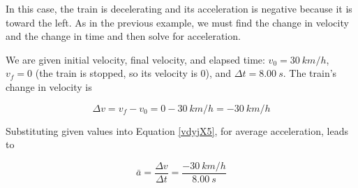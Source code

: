 \documentclass[main-ap-physics.tex]{subfiles}
\begin{document}
\begin{center}
\end{center}

\Solution In this case, the train is decelerating and its acceleration is negative because it is toward the left. As in the previous example, we must find the change in velocity and the change in time and then solve for acceleration.

\vspace{1em}

We are given initial velocity, final velocity, and elapsed time: $v_0 = \SI{30}{km/h}$, $v_f = 0$ (the train is stopped, so its velocity is 0), and $\Delta t = \SI{8.00}{s}$. The train's change in velocity is

\begin{equation*}
    \Delta v = v_f - v_0 = 0 - \SI{30}{km/h} = -\SI{30}{km/h}
\end{equation*}

Substituting given values into Equation \ref{vdyjX5}, for average acceleration, leads to 

\begin{equation*}
    \bar{a} = \frac{\Delta v}{\Delta t} = \frac{-\SI{30}{km/h}}{\SI{8.00}{s}}
\end{equation*}
\end{document}
